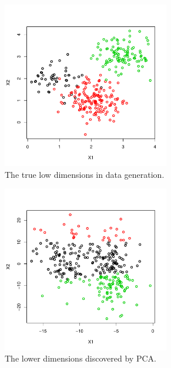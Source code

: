 \documentclass[12pt]{article}
\begin{document}
\begin{figure}[H]
  \begin{subfigure}[b]{0.32\textwidth}
 \includegraphics[width=0.8\textwidth]{pics/simX}
  \caption{The true low dimensions in data generation.}
\label{fig:sim_truth}
\end{subfigure}
  \hfill
   \begin{subfigure}[b]{0.32\textwidth}
 \includegraphics[width=0.8\textwidth]{pics/simPCAX}
  \caption{The lower dimensions discovered by PCA.}
  \label{fig:sim_pca}
\end{subfigure}
  \hfill
 \begin{subfigure}[b]{0.32\textwidth}

\end{subfigure}
\end{figure}
\end{document}

